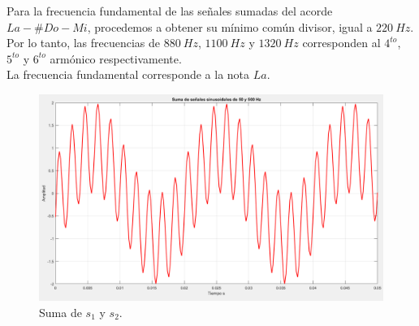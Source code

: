 \documentclass[letterpaper,onecolumn,10pt,journal,final]{IEEEtran}
\begin{document}
\begin{enumerate}[{1)}]
    Para la frecuencia fundamental de las señales sumadas del acorde $La-\#Do-Mi$, procedemos a obtener su mínimo común divisor, igual a $220~Hz$. Por lo tanto, las frecuencias de $880~Hz$, $1100~Hz$ y $1320~Hz$ corresponden al $4^{to}$, $5^{to}$ y $6^{to}$ armónico respectivamente.  \\
    La frecuencia fundamental corresponde a la nota $La$.
    \begin{figure}[H]
    \centering
    \includegraphics[scale=0.4]{Figuras/plotIII2.png}
    \caption{Suma de $s_1$ y $s_2$.}\label{III2}
    \end{figure}


\end{enumerate}
\end{document}
